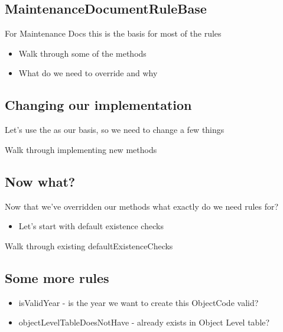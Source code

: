 \begin{ifhtml}
    \begin{s5slide}
        \section{MaintenanceDocumentRuleBase}
            For Maintenance Docs this is the basis for most of the rules
            \begin{s5notes}
                \begin{itemize}
                    \item Walk through some of the methods
                    \item What do we need to override and why
                \end{itemize}
            \end{s5notes}
    \end{s5slide}
    \begin{s5slide}
        \section{Changing our implementation}
            Let's use the  as our basis, so we need to change a few things
            \begin{s5notes}
                Walk through implementing new methods
            \end{s5notes}
    \end{s5slide}
    \begin{s5slide}
        \section{Now what?}
            Now that we've overridden our methods what exactly do we need rules for?
            \begin{itemize}
                \item Let's start with default existence checks
            \end{itemize}
            \begin{s5notes}
                Walk through existing defaultExistenceChecks
            \end{s5notes}
    \end{s5slide}
    \begin{s5slide}
        \section{Some more rules}
            \begin{itemize}
                \item isValidYear - is the year we want to create this ObjectCode valid?
                \item objectLevelTableDoesNotHave - already exists in Object Level table?
            \end{itemize}
    \end{s5slide}
\end{ifhtml}